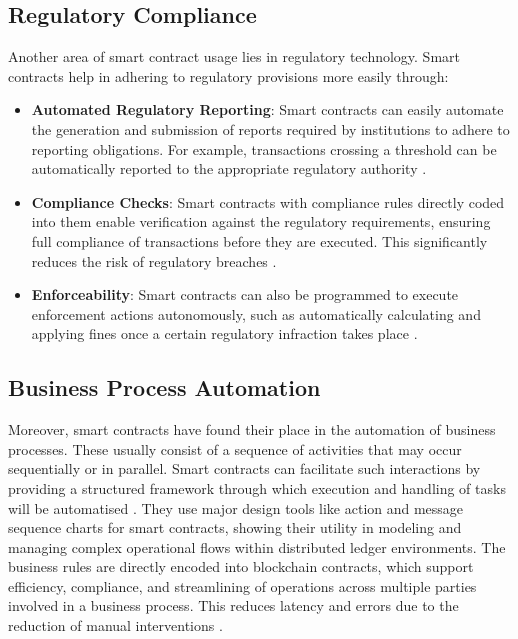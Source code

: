 \subsection{Regulatory Compliance}

Another area of smart contract usage lies in regulatory technology. Smart contracts help in adhering to regulatory provisions more easily through:

\begin{itemize}
    \item \textbf{Automated Regulatory Reporting}: Smart contracts can easily automate the generation and submission of reports required by institutions to adhere to reporting obligations. For example, transactions crossing a threshold can be automatically reported to the appropriate regulatory authority \cite{BarberisEtAl2019}.
    \item \textbf{Compliance Checks}: Smart contracts with compliance rules directly coded into them enable verification against the regulatory requirements, ensuring full compliance of transactions before they are executed. This significantly reduces the risk of regulatory breaches \cite{BarberisEtAl2019}.
    \item \textbf{Enforceability}: Smart contracts can also be programmed to execute enforcement actions autonomously, such as automatically calculating and applying fines once a certain regulatory infraction takes place \cite{MagazzeniEtAl2017}.
\end{itemize}

\subsection{Business Process Automation}

Moreover, smart contracts have found their place in the automation of business processes. These usually consist of a sequence of activities that may occur sequentially or in parallel. Smart contracts can facilitate such interactions by providing a structured framework through which execution and handling of tasks will be automatised \cite{MagazzeniEtAl2017}. They use major design tools like action and message sequence charts for smart contracts, showing their utility in modeling and managing complex operational flows within distributed ledger environments. The business rules are directly encoded into blockchain contracts, which support efficiency, compliance, and streamlining of operations across multiple parties involved in a business process. This reduces latency and errors due to the reduction of manual interventions \cite{ChikovEtAl2023}.

